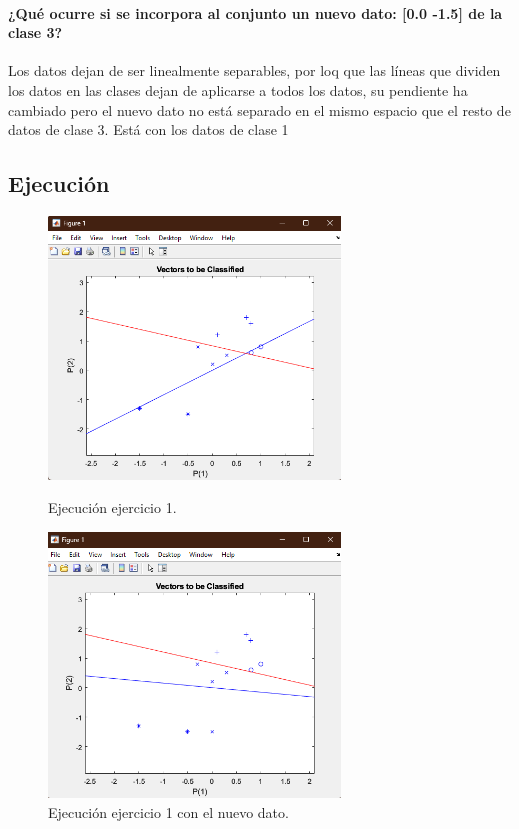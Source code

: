 \documentclass[a4paper, 12pt]{article}
\begin{document}
    
        \paragraph{¿Qué ocurre si se incorpora al conjunto un nuevo dato: [0.0 -1.5] de la clase 3?\\}
        Los datos dejan de ser linealmente separables, por loq que las líneas que dividen los datos en las clases dejan de aplicarse a todos los datos, su pendiente ha cambiado pero el nuevo dato no está separado en el mismo espacio que el resto de datos de clase 3. Está con los datos de clase 1

        \newpage
	\subsection{Ejecución}
    	\begin{figure}[htp!]
    		\centering
    		\includegraphics[width=0.69\textwidth]{figures/parte1/Ej1/Ej1_fig1.png}
    		\caption{Ejecución ejercicio 1.}
                \includegraphics[width=0.69\textwidth]{figures/parte1/Ej1/Ej1_fig2.png}
        		\caption{Ejecución ejercicio 1 con el nuevo dato.}
    	\end{figure}
        \newpage
\end{document}
